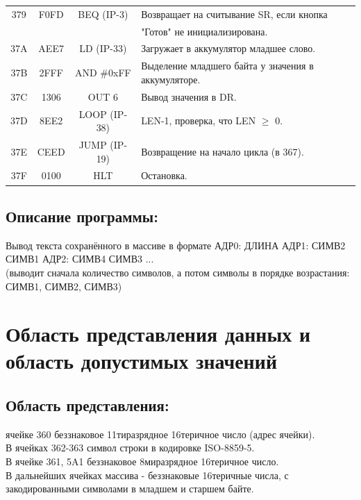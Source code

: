 \begin{center}
\begin{tabular}{|c|c|c|l|}
        379                   & F0FD                  & BEQ (IP-3)         & Возвращает на считывание SR, если кнопка            \\
        &                       &                    & "Готов" не инициализирована.                        \\
        37A                   & AEE7                  & LD (IP-33)         & Загружает в аккумулятор младшее слово.              \\
        37B                   & 2FFF                  & AND \#0xFF         & Выделение младшего байта у значения в аккумуляторе. \\
        37C                   & 1306                  & OUT 6              & Вывод значения в DR.                                \\
        37D                   & 8EE2                  & LOOP (IP-38)       & LEN-1, проверка, что LEN $\geqslant$ 0.             \\
        37E                   & CEED                  & JUMP (IP-19)       & Возвращение на начало цикла (в 367).                \\
        37F                   & 0100                  & HLT                & Остановка.                                          \\
        \hline

    \end{tabular}
\end{center}

\subsection{Описание программы:}
Вывод текста сохранённого в массиве в формате АДР0: ДЛИНА АДР1: СИМВ2 СИМВ1 АДР2: СИМВ4 СИМВ3 ... \\
\footnotesize (выводит сначала количество символов, а потом символы в порядке возрастания: СИМВ1, СИМВ2, СИМВ3)\\
\normalsize

\section{Область представления данных и область допустимых значений}

\subsection{Область представления:}
 ячейке 360 беззнаковое 11тиразрядное 16теричное число (адрес ячейки).   \\
В ячейках 362-363 символ строки в кодировке ISO-8859-5. \\
В ячейке 361, 5A1 беззнаковое 8миразрядное 16теричное число.    \\
В дальнейших ячейках массива - беззнаковые 16теричные числа, с закодированными символами в младшем и старшем байте. \\

